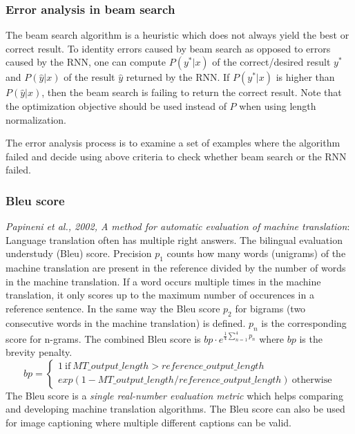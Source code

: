 \documentclass{article}
\begin{document}
\subsubsection{Error analysis in beam search}
The beam search algorithm is a heuristic which does not always yield the best or correct result.
To identity errors caused by beam search as opposed to errors caused by the RNN,
one can compute $P(y^*|x)$ of the correct/desired result $y^*$ and $P(\hat{y}|x)$ of the result $\hat{y}$ returned by the RNN.
If $P(y^*|x)$ is higher than $P(\hat{y}|x)$, then the beam search is failing to return the correct result.
Note that the optimization objective should be used instead of $P$ when using length normalization.

The error analysis process is to examine a set of examples where the algorithm failed and decide using above criteria
to check whether beam search or the RNN failed.

\subsubsection{Bleu score}
\emph{Papineni et al., 2002, A method for automatic evaluation of machine translation}:
Language translation often has multiple right answers.
The bilingual evaluation understudy (Bleu) score.
Precision $p_1$ counts how many words (unigrams) of the machine translation are present in the reference
divided by the number of words in the machine translation.
If a word occurs multiple times in the machine translation, it only scores up to the maximum number of occurences in a reference sentence.
In the same way the Bleu score $p_2$ for bigrams (two consecutive words in the machine translation) is defined.
$p_n$ is the corresponding score for n-grams.
The combined Bleu score is $bp\cdot e^{\frac{1}{4}\sum_{n=1}^4 p_n}$
where $bp$ is the brevity penalty.
\begin{equation}
  bp=\left\{\begin{array}{l}1\ \mathrm{if}\ MT\_output\_length > reference\_output\_length\\
  exp(1-MT\_output\_length/reference\_output\_length)\ \mathrm{otherwise}\end{array}\right.
\end{equation}
The Bleu score is a \emph{single real-number evaluation metric} which helps comparing and developing machine translation algorithms.
The Bleu score can also be used for image captioning where multiple different captions can be valid.
\end{document}
